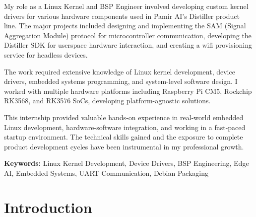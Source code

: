 \documentclass[12pt,a4paper]{report}
\begin{document}
\vspace{0.5cm}


My role as a Linux Kernel and BSP Engineer involved developing custom kernel drivers for various hardware components used in Pamir AI's Distiller product line. The major projects included designing and implementing the SAM (Signal Aggregation Module) protocol for microcontroller communication, developing the Distiller SDK for userspace hardware interaction, and creating a wifi provisioning service for headless devices.

\vspace{0.5cm}

The work required extensive knowledge of Linux kernel development, device drivers, embedded systems programming, and system-level software design. I worked with multiple hardware platforms including Raspberry Pi CM5, Rockchip RK3568, and RK3576 SoCs, developing platform-agnostic solutions.

\vspace{0.5cm}

This internship provided valuable hands-on experience in real-world embedded Linux development, hardware-software integration, and working in a fast-paced startup environment. The technical skills gained and the exposure to complete product development cycles have been instrumental in my professional growth.

\vspace{1cm}

\noindent
\textbf{Keywords:} Linux Kernel Development, Device Drivers, BSP Engineering, Edge AI, Embedded Systems, UART Communication, Debian Packaging

\newpage
\tableofcontents

\newpage
{}

\chapter{Introduction}
\end{document}
